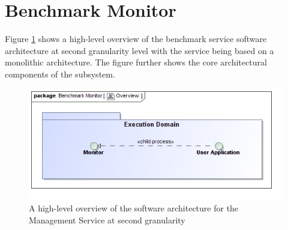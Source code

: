 \section{Benchmark Monitor}
Figure \ref{fig:benchmarkSoftwareArchitecture} shows a high-level overview of
the benchmark service software architecture at second granularity level with the
service being based on a monolithic architecture. The figure further shows the core
architectural components of the subsystem.
\begin{figure}[H]
  \begin{center}
  \includegraphics[scale=0.4]{../Diagrams and Charts/Overview/BenchmarkInfrastructure.jpg}
  \caption{A high-level overview of the software architecture for the Management Service at second granularity}
  \label{fig:benchmarkSoftwareArchitecture}
  \end{center}
\end{figure}
